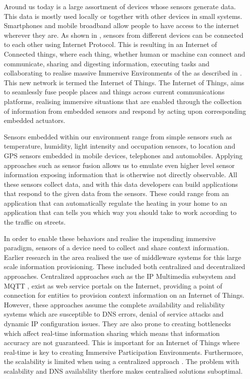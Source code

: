 Around us today is a large assortment of devices whose sensors generate data. This data is mostly used locally or together with other devices in small systems. Smartphones and mobile broadband allow people to have access to the internet wherever they are. As shown in \cite{chui2010internet}, sensors from different devices can be connected to each other using Internet Protocol. This is resulting in an Internet of Connected things, where each thing, whether human or machine can connect and communicate, sharing and digesting information, executing tasks and collaborating to realise massive Immersive Environments of the as described in \cite{tan2010future}. This new network is termed the Internet of Things. The Internet of Things, aims to seamlessly fuse people places and things across current communications platforms, realising immersive situations that are enabled through the collection of information from embedded sensors and respond by acting upon corresponding embedded actuators. 

Sensors embedded within our environment range from simple sensors such as temperature, humidity, light intensity and occupation sensors, to location and GPS sensors embedded in mobile devices, telephones and automobiles. Applying approaches such as sensor fusion allows us to emulate even higher level sensor information exposing information that is otherwise not directly observable. All these sensors collect data, and with this data developers can build applications that respond to the given data from the sensors. These could range from an application that can automatically regulate the heating in your home to an application that can tells you which way you should take to work according to the traffic on streets.

In order to enable these behaviors and realise the impending immersive paradigm, sensors of a device need to collect and share context information. Earlier research in the area realised the use of middleware systems for this large scale information provisioning. These included both centralized and decentralized approaches. Centralized approaches such as the IP Multimedia subsystem \cite{Kardeby:2010:UMF:1845879.1846331} and MQTT \cite{HunkelerTS08}, exist as web service portals on the Internet, providing a point of connection for entities to provision context information on an Internet of Things. However, these approaches assume the complete availability and reliability systems which are susceptible to DNS errors, denial of service attacks and dynamic IP configuration issues. They are also prone to creating bottlenecks which affect real-time information sharing which means that information accuracy are not guaranteed. This is important for an Internet of Things where real-time is key to creating Immersive Participation Environments. Furthermore, the scalability is limited when using a centralized approach \cite{Kanter539187}. The problem with scalability and DNS availability therfore makes centralised solutions suboptimal.

